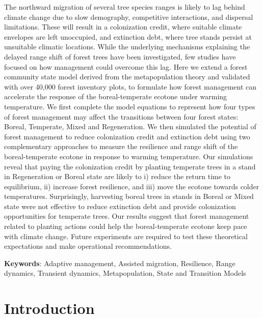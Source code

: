 The northward migration of several tree species ranges is likely to lag
behind climate change due to slow demography, competitive interactions,
and dispersal limitations. These will result in a colonization credit,
where suitable climate envelopes are left unoccupied, and extinction
debt, where tree stands persist at unsuitable climatic locations. While
the underlying mechanisms explaining the delayed range shift of forest
trees have been investigated, few studies have focused on how management
could overcome this lag. Here we extend a forest community state model
derived from the metapopulation theory and validated with over 40,000
forest inventory plots, to formulate how forest management can
accelerate the response of the boreal-temperate ecotone under warming
temperature. We first complete the model equations to represent how four
types of forest management may affect the transitions between four
forest states: Boreal, Temperate, Mixed and Regeneration. We then
simulated the potential of forest management to reduce colonization
credit and extinction debt using two complementary approaches to measure
the resilience and range shift of the boreal-temperate ecotone in
response to warming temperature. Our simulations reveal that paying the
colonization credit by planting temperate trees in a stand in
Regeneration or Boreal state are likely to i) reduce the return time to
equilibrium, ii) increase forest resilience, and iii) move the ecotone
towards colder temperatures. Surprisingly, harvesting boreal trees in
stands in Boreal or Mixed state were not effective to reduce extinction
debt and provide colonization opportunities for temperate trees. Our
results suggest that forest management related to planting actions could
help the boreal-temperate ecotone keep pace with climate change. Future
experiments are required to test these theoretical expectations and make
operational recommendations.

\textbf{Keywords}: Adaptive management, Assisted
migration, Resilience, Range dynamics, Transient
dynamics, Metapopulation, State and Transition Models

\hypertarget{introduction}{%
\section{Introduction}\label{introduction}}

